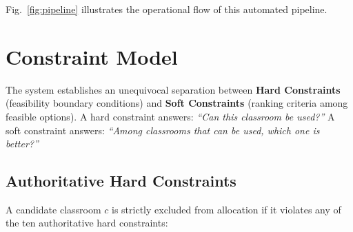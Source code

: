 \documentclass[conference]{IEEEtran}
\begin{document}
Fig.~\ref{fig:pipeline} illustrates the operational flow of this automated pipeline.

\section{Constraint Model}
The system establishes an unequivocal separation between \textbf{Hard Constraints} (feasibility boundary conditions) and \textbf{Soft Constraints} (ranking criteria among feasible options). A hard constraint answers: \textit{``Can this classroom be used?''} A soft constraint answers: \textit{``Among classrooms that can be used, which one is better?''}

\subsection{Authoritative Hard Constraints}
A candidate classroom $c$ is strictly excluded from allocation if it violates any of the ten authoritative hard constraints:
\end{document}

